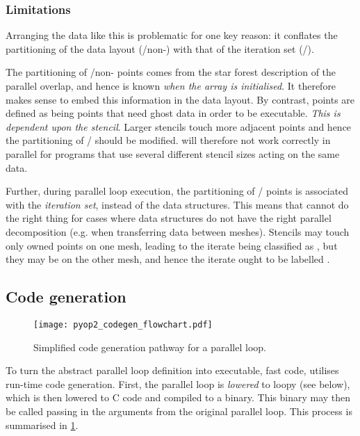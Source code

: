 \documentclass[thesis]{subfiles}
\begin{document}
\subsubsection{Limitations}
\label{sec:pyop2_parallel_limitation}

Arranging the data like this is problematic for one key reason: it conflates the partitioning of the data layout (\ghostiter{}/non-\ghostiter{}) with that of the iteration set (\coreiter{}/\ownediter{}).

The partitioning of \ghostiter{}/non-\ghostiter{} points comes from the star forest description of the parallel overlap, and hence is known \emph{when the array is initialised}.
It therefore makes sense to embed this information in the data layout.
By contrast, \ownediter{} points are defined as being points that need ghost data in order to be executable.
\emph{This is dependent upon the stencil}.
Larger stencils touch more adjacent points and hence the partitioning of \coreiter{}/\ownediter{} should be modified.
 will therefore not work correctly in parallel for programs that use several different stencil sizes acting on the same data.

Further, during parallel loop execution, the partitioning of \coreiter{}/\ownediter{} points is associated with the \emph{iteration set}, instead of the data structures.
This means that  cannot do the right thing for cases where data structures do not have the right parallel decomposition (e.g. when transferring data between meshes).
  Stencils may touch only owned points on one mesh, leading to the iterate being classified as \coreiter{}, but they may be \ghostiter{} on the other mesh, and hence the iterate ought to be labelled \ownediter{}.

\subsection{Code generation}
\label{sec:pyop2_codegen}

\begin{figure}
  \texttt{[image: pyop2\_codegen\_flowchart.pdf]}
  \caption{Simplified code generation pathway for a  parallel loop.}
  \label{fig:pyop2_codegen}
\end{figure}

To turn the abstract parallel loop definition into executable, fast code,  utilises run-time code generation.
First, the parallel loop is \emph{lowered} to loopy (see below), which is then lowered to C code and compiled to a binary.
This binary may then be called passing in the arguments from the original parallel loop.
This process is summarised in \cref{fig:pyop2_codegen}.
\end{document}
